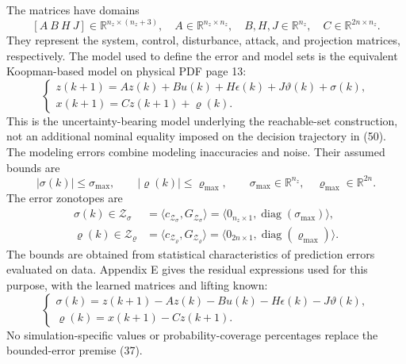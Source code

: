 \documentclass{article}
\begin{document}
The matrices have domains
\[
[A\ B\ H\ J]\in\mathbb{R}^{n_z\times(n_z+3)},\quad
A\in\mathbb{R}^{n_z\times n_z},\quad B,H,J\in\mathbb{R}^{n_z},\quad C\in\mathbb{R}^{2n\times n_z}.
\]
They represent the system, control, disturbance, attack, and projection matrices, respectively. The model used to define the error and model sets is the equivalent Koopman-based model on physical PDF page 13:
\begin{equation}
\begin{cases}
z(k+1)=Az(k)+Bu(k)+H\epsilon(k)+J\vartheta(k)+\sigma(k),\\
x(k+1)=Cz(k+1)+\varrho(k).
\end{cases} \tag{36}
\end{equation}
This is the uncertainty-bearing model underlying the reachable-set construction, not an additional nominal equality imposed on the decision trajectory in (50). The modeling errors combine modeling inaccuracies and noise. Their assumed bounds are
\begin{equation}
|\sigma(k)|\leq\sigma_{\max},\qquad |\varrho(k)|\leq\varrho_{\max},\qquad
\sigma_{\max}\in\mathbb{R}^{n_z},\quad\varrho_{\max}\in\mathbb{R}^{2n}. \tag{37}
\end{equation}
The error zonotopes are
\begin{equation}
\begin{aligned}
\sigma(k)\in\mathcal{Z}_{\sigma}
&=\langle c_{\mathcal{Z}_{\sigma}},G_{\mathcal{Z}_{\sigma}}\rangle
=\langle0_{n_z\times1},\operatorname{diag}(\sigma_{\max})\rangle,\\
\varrho(k)\in\mathcal{Z}_{\varrho}
&=\langle c_{\mathcal{Z}_{\varrho}},G_{\mathcal{Z}_{\varrho}}\rangle
=\langle0_{2n\times1},\operatorname{diag}(\varrho_{\max})\rangle.
\end{aligned} \tag{38}
\end{equation}
The bounds are obtained from statistical characteristics of prediction errors evaluated on data. Appendix E gives the residual expressions used for this purpose, with the learned matrices and lifting known:
\begin{equation}
\begin{cases}
\sigma(k)=z(k+1)-Az(k)-Bu(k)-H\epsilon(k)-J\vartheta(k),\\
\varrho(k)=x(k+1)-Cz(k+1).
\end{cases} \tag{E.1}
\end{equation}
No simulation-specific values or probability-coverage percentages replace the bounded-error premise (37).
\end{document}
